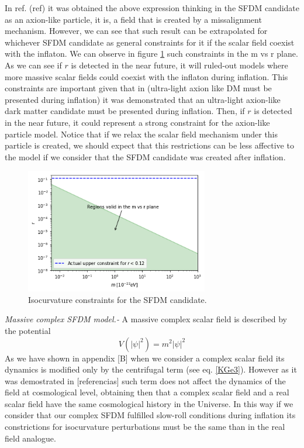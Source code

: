 \documentclass[twocolumn,           %
               showpacs,            %
               preprintnumbers,     %
               aps,                 %
               prl,          	    %
               letterpaper,             %
               superscriptaddress,      %
               nofootinbib,         %
               tightenlines,        %
               floats,floatfix      %
               ,usenatbib,
               ]{revtex4-1}
\begin{document}
In ref. (ref) it was obtained the above expression thinking in the SFDM candidate as an axion-like particle, it is, a field that is created by a missalignment mechanism. However, we can see that such result can be extrapolated for whichever SFDM candidate as general constraints for it if the scalar field coexist with the inflaton. We can observe in figure \ref{constraintsSFDM} such constraints in the m vs r plane. As we can see if $r$ is detected in the near future, it will ruled-out models where more massive scalar fields could coexist with the inflaton during inflation. This constraints are important given that in (ultra-light axion like DM must be presented during inflation) it was demonstrated that an ultra-light axion-like dark matter candidate must be presented during inflation. Then, if $r$ is detected in the near future, it could represent a strong constraint for the axion-like particle model. Notice that if we relax the scalar field mechanism under this particle is created, we should expect that this restrictions can be less affective to the model if we consider that the SFDM candidate was created after inflation. 
\begin{figure}
\includegraphics[width=8cm]{SFDMconstraints.png}
\caption{Isocurvature constraints for the SFDM candidate.}\label{constraintsSFDM}
\end{figure}

\textit{Massive complex SFDM model.-} A massive complex scalar field is described by the potential
\begin{equation}
V(|\psi|^2)= m^2|\psi|^2
\end{equation}
As we have shown in appendix [B] when we consider a complex scalar field its dynamics is modified only by the centrifugal term (see eq. \eqref{KGe3}). However as it was demostrated in [referencias] such term does not affect the dynamics of the field at cosmological level, obtaining then that a complex scalar field and a real scalar field have the same cosmological history in the Universe. In this way if we consider that our complex SFDM fulfilled slow-roll conditions during inflation its constrictions for isocurvature perturbations must be the same than in the real field analogue. 
\end{document}

